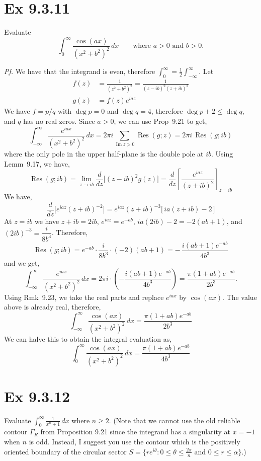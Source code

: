 \documentclass[a4paper]{article}
\DeclareMathOperator{\Res}{Res}
\begin{document}
\newpage
\section*{Ex 9.3.11}

\begin{prob}
Evaluate
\[
\int_{0}^{\infty}\frac{\cos(ax)}{(x^2+b^2)^2}\,dx
\qquad\text{where }a>0\text{ and }b>0.
\]
\end{prob}

\textit{Pf.} We have that the integrand is even, therefore $\int_0^\infty=\tfrac12\int_{-\infty}^{\infty}$. Let
\begin{align*}
f(z)&=\frac{1}{(z^2+b^2)^2}=\frac{1}{(z-ib)^2(z+ib)^2}
\\ 
g(z)&=f(z)e^{iaz}
\end{align*}
We have $f=p/q$ with $\deg p=0$ and $\deg q=4$, therefore $\deg p+2\le\deg q$, and $q$ has
no real zeros. Since $a>0$, we can use Prop~9.21 to get,
\[
\int_{-\infty}^{\infty}\frac{e^{iax}}{(x^2+b^2)^2}\,dx
=2\pi i\sum_{\operatorname{Im}z>0}\Res(g;z)=2\pi i\,\Res(g;ib)
\]
where the only pole in the upper half-plane is the double pole at $ib$. Using Lemm~9.17, we have,
\[
\Res(g;ib)=\lim_{z\to ib}\frac{d}{dz}\Big[(z-ib)^2g(z)\Big]
=\frac{d}{dz}\left[\frac{e^{iaz}}{(z+ib)^2}\right]_{z=ib}
\]
We have,
\[
\frac{d}{dz}\Big[e^{iaz}(z+ib)^{-2}\Big]
=e^{iaz}(z+ib)^{-3}\big[\,ia(z+ib)-2\,\big]
\]
At $z=ib$ we have $z+ib=2ib$, $e^{iaz}=e^{-ab}$, $ia(2ib)-2=-2(ab+1)$, and
$(2ib)^{-3}=\dfrac{i}{8b^3}$. Therefore,
\[
\Res(g;ib)=e^{-ab}\cdot\frac{i}{8b^3}\cdot(-2)(ab+1)
=-\,\frac{i(ab+1)e^{-ab}}{4b^3}
\]
and we get,
\[
\int_{-\infty}^{\infty}\frac{e^{iax}}{(x^2+b^2)^2}\,dx
=2\pi i\cdot\left(-\frac{i(ab+1)e^{-ab}}{4b^3}\right)
=\frac{\pi(1+ab)e^{-ab}}{2b^3}.
\]
Using Rmk~9.23, we take the real parts and replace $e^{iax}$ by $\cos(ax)$. The value above is already real, therefore,
\[
\int_{-\infty}^{\infty}\frac{\cos(ax)}{(x^2+b^2)^2}\,dx
=\frac{\pi(1+ab)e^{-ab}}{2b^3}
\]
We can halve this to obtain the integral evaluation as,
\[
\int_{0}^{\infty}\frac{\cos(ax)}{(x^2+b^2)^2}\,dx
=\frac{\pi(1+ab)e^{-ab}}{4b^3}
\]

\newpage
\section*{Ex 9.3.12}

\begin{prob}
Evaluate $\displaystyle\int_{0}^{\infty}\frac{1}{x^n+1}\,dx$ where $n\ge 2$.
(Note that we cannot use the old reliable contour $\Gamma_R$ from Proposition
9.21 since the integrand has a singularity at $x=-1$ when $n$ is odd. Instead, I
suggest you use the contour which is the positively oriented boundary of the
circular sector $S=\{re^{i\theta}:0\le\theta\le\tfrac{2\pi}{n}\text{ and }
0\le r\le\alpha\}$.)
\end{prob}
\end{document}

